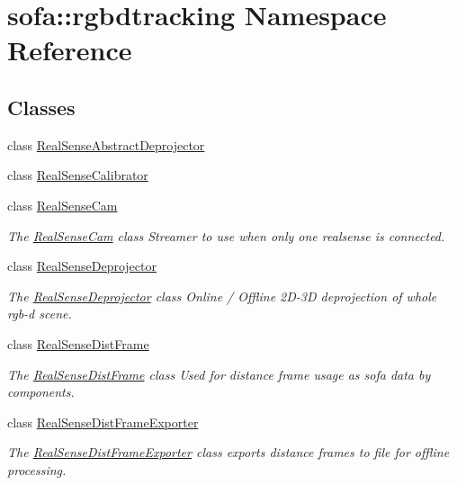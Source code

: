 \hypertarget{namespacesofa_1_1rgbdtracking}{}\section{sofa\+:\+:rgbdtracking Namespace Reference}
\label{namespacesofa_1_1rgbdtracking}
\subsection*{Classes}
\begin{DoxyCompactItemize}
\item 
class \hyperlink{classsofa_1_1rgbdtracking_1_1_real_sense_abstract_deprojector}{Real\+Sense\+Abstract\+Deprojector}
\item 
class \hyperlink{classsofa_1_1rgbdtracking_1_1_real_sense_calibrator}{Real\+Sense\+Calibrator}
\item 
class \hyperlink{classsofa_1_1rgbdtracking_1_1_real_sense_cam}{Real\+Sense\+Cam}
\begin{DoxyCompactList}\small\item\em The \hyperlink{classsofa_1_1rgbdtracking_1_1_real_sense_cam}{Real\+Sense\+Cam} class Streamer to use when only one realsense is connected. \end{DoxyCompactList}\item 
class \hyperlink{classsofa_1_1rgbdtracking_1_1_real_sense_deprojector}{Real\+Sense\+Deprojector}
\begin{DoxyCompactList}\small\item\em The \hyperlink{classsofa_1_1rgbdtracking_1_1_real_sense_deprojector}{Real\+Sense\+Deprojector} class Online / Offline 2\+D-\/3D deprojection of whole rgb-\/d scene. \end{DoxyCompactList}\item 
class \hyperlink{classsofa_1_1rgbdtracking_1_1_real_sense_dist_frame}{Real\+Sense\+Dist\+Frame}
\begin{DoxyCompactList}\small\item\em The \hyperlink{classsofa_1_1rgbdtracking_1_1_real_sense_dist_frame}{Real\+Sense\+Dist\+Frame} class Used for distance frame usage as sofa data by components. \end{DoxyCompactList}\item 
class \hyperlink{classsofa_1_1rgbdtracking_1_1_real_sense_dist_frame_exporter}{Real\+Sense\+Dist\+Frame\+Exporter}
\begin{DoxyCompactList}\small\item\em The \hyperlink{classsofa_1_1rgbdtracking_1_1_real_sense_dist_frame_exporter}{Real\+Sense\+Dist\+Frame\+Exporter} class exports distance frames to file for offline processing. \end{DoxyCompactList}\item 

\end{DoxyCompactItemize}
